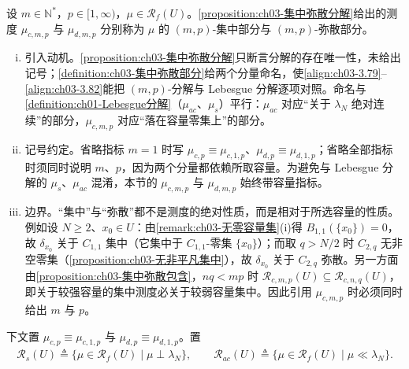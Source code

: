 \documentclass[../../main.tex]{subfiles}%
\begin{document}
\begin{definition}\label{definition:ch03-集中弥散部分}
设 $m\in\mathbb{N}^*$，$p\in[1,\infty)$，$\mu\in\mathscr{R}_f(U)$。\cref{proposition:ch03-集中弥散分解}给出的测度 $\mu_{c,m,p}$ 与 $\mu_{d,m,p}$ 分别称为 $\mu$ 的 $(m,p)$-集中部分与 $(m,p)$-弥散部分。
\end{definition}

\begin{remark}\label{remark:ch03-集中弥散部分动机}
\begin{enumerate}[(i)]
\item 引入动机。\cref{proposition:ch03-集中弥散分解}只断言分解的存在唯一性，未给出记号；\cref{definition:ch03-集中弥散部分}给两个分量命名，使\eqref{align:ch03-3.79}--\eqref{align:ch03-3.82}能把 $(m,p)$-分解与 Lebesgue 分解逐项对照。命名与\cref{definition:ch01-Lebesgue分解}（$\mu_{ac}$、$\mu_s$）平行：$\mu_{ac}$ 对应“关于 $\lambda_N$ 绝对连续”的部分，$\mu_{c,m,p}$ 对应“落在容量零集上”的部分。
\item 记号约定。省略指标 $m=1$ 时写 $\mu_{c,p}\equiv\mu_{c,1,p}$、$\mu_{d,p}\equiv\mu_{d,1,p}$；省略全部指标时须同时说明 $m$、$p$，因为两个分量都依赖所取容量。为避免与 Lebesgue 分解的 $\mu_s$、$\mu_{ac}$ 混淆，本节的 $\mu_{c,m,p}$ 与 $\mu_{d,m,p}$ 始终带容量指标。
\item 边界。“集中”与“弥散”都不是测度的绝对性质，而是相对于所选容量的性质。例如设 $N\geqslant2$、$x_0\in U$：由\cref{remark:ch03-无零容量集}(i)得 $B_{1,1}(\{x_0\})=0$，故 $\delta_{x_0}$ 关于 $C_{1,1}$ 集中（它集中于 $C_{1,1}$-零集 $\{x_0\}$）；而取 $q>N/2$ 时 $C_{2,q}$ 无非空零集（\cref{proposition:ch03-无非平凡集中}），故 $\delta_{x_0}$ 关于 $C_{2,q}$ 弥散。另一方面由\cref{proposition:ch03-集中弥散包含}，$nq<mp$ 时 $\mathscr{R}_{c,m,p}(U)\subseteq\mathscr{R}_{c,n,q}(U)$，即关于较强容量的集中测度必关于较弱容量集中。因此引用 $\mu_{c,m,p}$ 时必须同时给出 $m$ 与 $p$。
\end{enumerate}
\end{remark}

下文置 $\mu_{c,p}\equiv\mu_{c,1,p}$ 与 $\mu_{d,p}\equiv\mu_{d,1,p}$。置
\begin{align*}
\mathscr{R}_s(U)\triangleq \{\mu\in\mathscr{R}_f(U)\mid\mu\perp\lambda_N\},\qquad
\mathscr{R}_{ac}(U)\triangleq \{\mu\in\mathscr{R}_f(U)\mid\mu\ll\lambda_N\}.
\end{align*}
\end{document}
